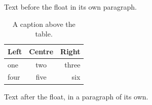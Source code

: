 \documentclass[12pt]{article}
\begin{document}
Text before the float in its own paragraph.

\begin{table}[h]
  \centering
  \caption{A caption above the table.}
  \begin{tabular}{lcr}\hline Left & Centre & Right\\\hline one & two & three\\ four & five & six\\\hline\end{tabular}
\end{table}

Text after the float, in a paragraph of its own.
\end{document}
